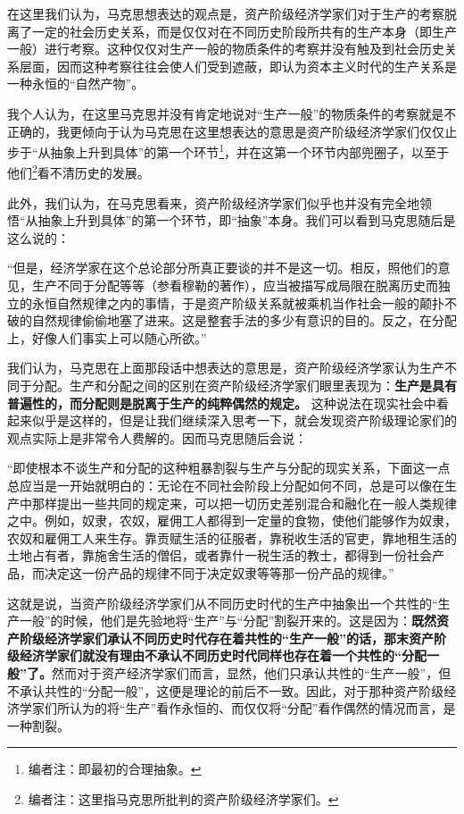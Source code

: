 \documentclass[a4paper,twoside,12pt,AutoFakeBold]{ctexart}
\begin{document}
在这里我们认为，马克思想表达的观点是，资产阶级经济学家们对于生产的考察脱离了一定的社会历史关系，而是仅仅对在不同历史阶段所共有的生产本身（即生产一般）进行考察。这种仅仅对生产一般的物质条件的考察并没有触及到社会历史关系层面，因而这种考察往往会使人们受到遮蔽，即认为资本主义时代的生产关系是一种永恒的“自然产物”。

我个人认为，在这里马克思并没有肯定地说对“生产一般”的物质条件的考察就是不正确的，我更倾向于认为马克思在这里想表达的意思是资产阶级经济学家们仅仅止步于“从抽象上升到具体”的第一个环节\footnote{编者注：即最初的合理抽象。}，并在这第一个环节内部兜圈子，以至于他们\footnote{编者注：这里指马克思所批判的资产阶级经济学家们。}看不清历史的发展。

此外，我们认为，在马克思看来，资产阶级经济学家们似乎也并没有完全地领悟“从抽象上升到具体”的第一个环节，即“抽象”本身。我们可以看到马克思随后是这么说的：



\begin{adjustwidth}{2em}{2em}
    \qquad\fangsong
    “但是，经济学家在这个总论部分所真正要谈的并不是这一切。相反，照他们的意见，生产不同于分配等等（参看穆勒的著作），应当被描写成局限在脱离历史而独立的永恒自然规律之内的事情，于是资产阶级关系就被乘机当作社会一般的颠扑不破的自然规律偷偷地塞了进来。这是整套手法的多少有意识的目的。反之，在分配上，好像人们事实上可以随心所欲。”
\end{adjustwidth}
\vspace{0.8cm}

我们认为，马克思在上面那段话中想表达的意思是，资产阶级经济学家认为生产不同于分配。生产和分配之间的区别在资产阶级经济学家们眼里表现为：\textbf{生产是具有普遍性的，而分配则是脱离于生产的纯粹偶然的规定。} 这种说法在现实社会中看起来似乎是这样的，但是让我们继续深入思考一下，就会发现资产阶级理论家们的观点实际上是非常令人费解的。因而马克思随后会说：

\begin{adjustwidth}{2em}{2em}
    \qquad\fangsong
    “即使根本不谈生产和分配的这种粗暴割裂与生产与分配的现实关系，下面这一点总应当是一开始就明白的：无论在不同社会阶段上分配如何不同，总是可以像在生产中那样提出一些共同的规定来，可以把一切历史差别混合和融化在一般人类规律之中。例如，奴隶，农奴，雇佣工人都得到一定量的食物，使他们能够作为奴隶，农奴和雇佣工人来生存。靠贡赋生活的征服者，靠税收生活的官吏，靠地租生活的土地占有者，靠施舍生活的僧侣，或者靠什一税生活的教士，都得到一份社会产品，而决定这一份产品的规律不同于决定奴隶等等那一份产品的规律。”
\end{adjustwidth}
\vspace{0.2cm}
这就是说，当资产阶级经济学家们从不同历史时代的生产中抽象出一个共性的“生产一般”的时候，他们是先验地将“生产”与“分配”割裂开来的。这是因为：\textbf{既然资产阶级经济学家们承认不同历史时代存在着共性的“生产一般”的话，那末资产阶级经济学家们就没有理由不承认不同历史时代同样也存在着一个共性的“分配一般”了。}然而对于资产经济学家们而言，显然，他们只承认共性的“生产一般”，但不承认共性的“分配一般”，这便是理论的前后不一致。因此，对于那种资产阶级经济学家们所认为的将“生产”看作永恒的、而仅仅将“分配”看作偶然的情况而言，是一种割裂。
\end{document}
